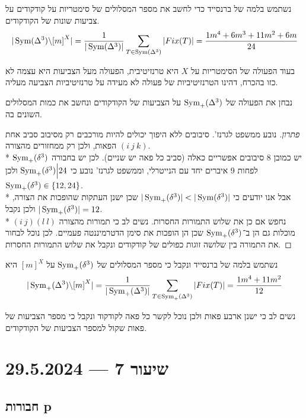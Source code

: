 נשתמש בלמה של ברנסייד כדי לחשב את מספר המסלולים של סימטריות על קודקודים על צביעות שונות של הקודקודים.
\[
	|\operatorname{Sym}(\Delta^3) \backslash {[m]}^X| = \frac{1}{|\operatorname{Sym}(\Delta^3)|} \sum_{T \in \operatorname{Sym}(\Delta^3)} |Fix(T)| = \frac{1m^4 + 6m^3 + 11m^2 + 6m}{24}
\]
\begin{conclusion}
	בעוד הפעולה של הסימטריות על $X$ היא טרנזיטיבית, הפעולה מעל הצביעות היא עצמה לא כזו בהכרח, דהינו הטרנזיטיביות של פעולה לא מעידה על טרנזיטיביות הצביעה מעליה.
\end{conclusion}
\begin{proposition}
	נבחן את הפעולה של $\operatorname{Sym}_+(\Delta^3)$ על הצביעות של הקודקודים ונחשב את כמות המסלולים השונים בה.
\end{proposition}
\begin{proof}[פתרון]
	נובע ממשפט לגרנז'. סיבובים ללא היפוך יכולים להיות מורכבים רק מסיבוב סביב אחת הפאות, ולכן רק ממחזורים מהצורה $(i\ j\ k)$. \\*
	יש כמובן $8$ סיבובים אפשריים כאלה (סביב כל פאה יש שניים).
	לכן יש בחבורה $\operatorname{Sym}_+(\delta^3)$ לפחות 9 איברים יחד עם הנייטרלי, וממשפט לגרנז' נובע כי $\operatorname{Sym}_+(\delta^3) \Big| 24$ ולכן $\operatorname{Sym}_+(\delta^3) \in \{12, 24\}$. \\*
	אבל אנו יודעים כי $|\operatorname{Sym}_+(\delta^3)| < |\operatorname{Sym}(\delta^3)|$ שכן ישנן העתקות שהופכות את הצורה, ולכן נקבל $|\operatorname{Sym}_+(\delta^3)| = 12$. \\*
	נחפש אם כן את שלוש התמורות החסרות. נשים לב כי תמורות מהצורה $(i\ j)(l\ l)$ מוכלות גם הן ב־$\operatorname{Sym}_+(\delta^3)$ שכן הן הופכות את סימן הדטרמיננטה פעמיים.
	לכן נוכל לבחור את התמורה בין שלושה זוגות כפולים של קודקודים ונקבל את שלוש התמורות החסרות.
\end{proof}
\begin{definition}
	נשתמש בלמה של ברנסייד ונקבל כי מספר המסלולים של $\operatorname{Sym}_+(\delta^3)$ על ${[m]}^X$ היא
	\[
		|\operatorname{Sym}_+(\Delta^3) \backslash {[m]}^X| = \frac{1}{|\operatorname{Sym}_+(\Delta^3)|} \sum_{T \in \operatorname{Sym}_+(\Delta^3)} |Fix(T)| = \frac{1m^4 + 11m^2}{12}
	\]
\end{definition}
\begin{remark}
	נשים לב כי ישנן ארבע פאות ולכן נוכל לקשר כל פאה לקודקוד ונקבל כי מספר הצביעות של פאות שקול למספר הצביעות של הקודקודים.
\end{remark}

\section{שיעור 7 --- 29.5.2024}
\subsection{חבורות p}
